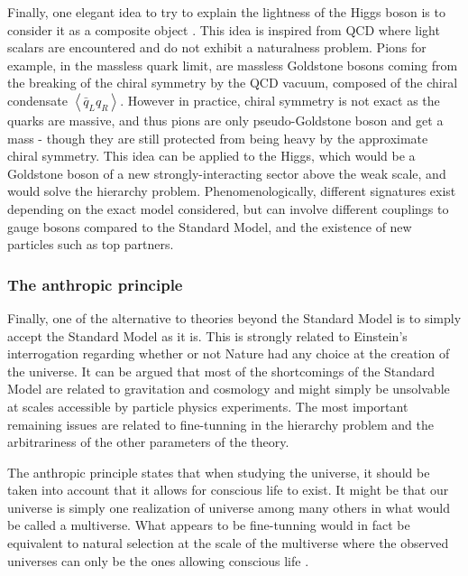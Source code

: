         Finally, one elegant idea to try to explain the lightness of the Higgs boson is to
        consider it as a composite object \cite{LittleHiggs, CompositeHiggs}. This idea is
        inspired from QCD where light scalars are encountered and do not exhibit a naturalness
        problem. Pions for example, in the massless quark limit, are massless Goldstone
        bosons coming from the breaking of the chiral symmetry by the QCD vacuum, composed
        of the chiral condensate $\left<\bar{q}_L q_R\right>$. However in practice,
        chiral symmetry is not exact as the quarks are massive, and thus pions are only
        pseudo-Goldstone boson and get a mass - though they are still protected from being
        heavy by the approximate chiral symmetry. This idea can be applied to the Higgs,
        which would be a Goldstone boson of a new strongly-interacting sector above the
        weak scale, and would solve the hierarchy problem. Phenomenologically, different
        signatures exist depending on the exact model considered, but can involve different
        couplings to gauge bosons compared to the Standard Model, and the existence of new
        particles such as top partners.

            \subsubsection{The anthropic principle}

        Finally, one of the alternative to theories beyond the Standard Model is to
        simply accept the Standard Model as it is. This is strongly related to Einstein's
        interrogation regarding whether or not Nature had any choice at the creation of
        the universe. It can be argued that most of the shortcomings of the Standard Model
        are related to gravitation and cosmology and might simply be unsolvable at scales accessible
        by particle physics experiments. The most important remaining issues are related to
        fine-tunning in the hierarchy problem and the arbitrariness of the other parameters
        of the theory.

        The anthropic principle states that when studying the universe, it should be taken
        into account that it allows for conscious life to exist. It might be that our universe
        is simply one realization of universe among many others in what would be called a
        multiverse. What appears to be fine-tunning would in fact be equivalent to natural
        selection at the scale of the multiverse where the observed universes can only be
        the ones allowing conscious life \cite{AnthropicPrincipleBarrow, StarsInOtherUniverses}.


